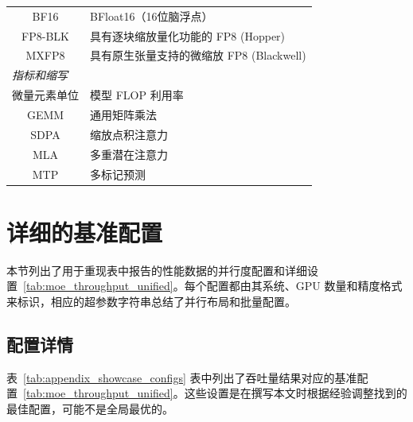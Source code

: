 \begin{table}[ht]
\begin{tabular}{cl}
BF16 & BFloat16（16位脑浮点） \\
FP8-BLK & 具有逐块缩放量化功能的 FP8 (Hopper) \\
MXFP8 & 具有原生张量支持的微缩放 FP8 (Blackwell) \\
\midrule
\multicolumn{2}{l}{\emph{指标和缩写}} \\
微量元素单位 & 模型 FLOP 利用率 \\
GEMM & 通用矩阵乘法 \\
SDPA & 缩放点积注意力 \\
MLA & 多重潜在注意力 \\
MTP & 多标记预测 \\
\bottomrule
\end{tabular}
\end{table}


\section{详细的基准配置}\label{sec:showcase_settings}

本节列出了用于重现表中报告的性能数据的并行度配置和详细设置~\ref{tab:moe_throughput_unified}。每个配置都由其系统、GPU 数量和精度格式来标识，相应的超参数字符串总结了并行布局和批量配置。 

\subsection{配置详情} 
表~\ref{tab:appendix_showcase_configs} 表中列出了吞吐量结果对应的基准配置~\ref{tab:moe_throughput_unified}。这些设置是在撰写本文时根据经验调整找到的最佳配置，可能不是全局最优的。

